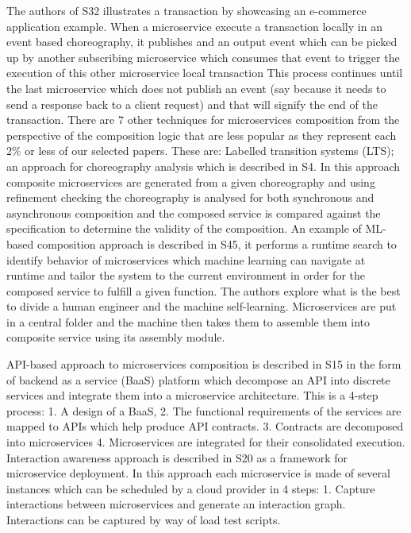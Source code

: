 \documentclass{article}
\begin{document}
\begin{multicols}{2}
The authors of S32 illustrates a transaction by showcasing an  e-commerce application example. When a microservice execute a transaction locally in an event based choreography, it publishes and an output event which can be picked up by another subscribing microservice which consumes that event to trigger the execution of this other microservice local transaction This process continues until the last microservice which does not publish an event (say because it needs to send a response back to a client request) and that will signify the end of the transaction. There are 7 other techniques for microservices composition from the perspective of the composition logic that are less popular as they represent each 2\% or less of our selected papers. These are: Labelled transition systems (LTS); an approach for choreography analysis which is described in S4. In this approach composite microservices are generated from a given choreography and using refinement checking the choreography is analysed for both synchronous and asynchronous composition and the composed service is compared against the specification to determine the validity of the composition.
An example of ML-based composition approach is described in S45, it performs a runtime search to identify behavior of microservices which machine learning can navigate at runtime and tailor the system to the current environment in order for the composed service to fulfill a given function. The authors explore what is the best to divide a human engineer and the machine self-learning. Microservices are put in a central folder and the machine then takes them to assemble them into composite service using its assembly module. 

API-based approach to microservices composition is described in S15 in the form of backend as a service (BaaS) platform which decompose an API into discrete services and integrate them into a microservice architecture. This is a 4-step process: 1. A design of a BaaS, 2. The functional requirements of the services are mapped to APIs which help produce API contracts. 3. Contracts are decomposed into microservices 4. Microservices are integrated for their consolidated execution. 
Interaction awareness approach is described in S20 as a framework for microservice deployment. In this approach each microservice is made of several instances which can be scheduled by a cloud provider in 4 steps: 1. Capture interactions between microservices and generate an interaction graph. Interactions can be captured by way of load test scripts.


\end{multicols}
\end{document}
